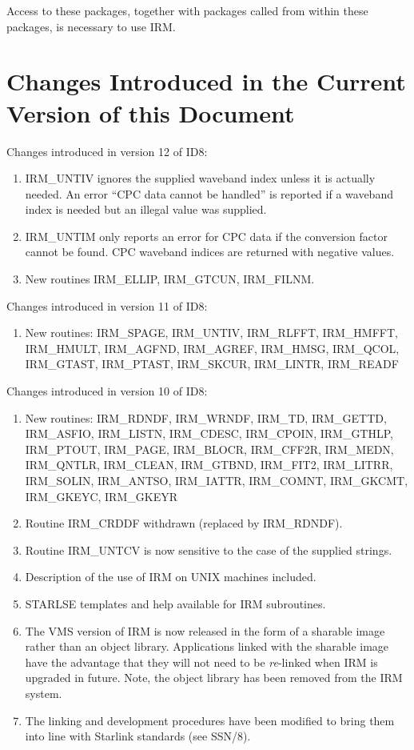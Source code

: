 Access to these packages, together with packages called from within these 
packages, is necessary to use IRM. 

\section {Changes Introduced in the Current Version of this Document}
\label {SEC:CHANGES}

Changes introduced in version 12 of ID8:
\begin{enumerate}
\item IRM\_UNTIV ignores the supplied waveband index unless it is actually
needed. An error ``CPC data cannot be handled'' is reported if a waveband index
is needed but an illegal value was supplied. 
\item IRM\_UNTIM only reports an error for CPC data if the conversion factor 
cannot be found. CPC waveband indices are returned with negative values.
\item New routines IRM\_ELLIP, IRM\_GTCUN, IRM\_FILNM.
\end{enumerate}

Changes introduced in version 11 of ID8:
\begin {enumerate}
\item New routines: IRM\_SPAGE, IRM\_UNTIV, IRM\_RLFFT, IRM\_HMFFT, 
IRM\_HMULT, IRM\_AGFND, IRM\_AGREF, IRM\_HMSG, IRM\_QCOL, IRM\_GTAST,
IRM\_PTAST, IRM\_SKCUR, IRM\_LINTR, IRM\_READF
\end {enumerate}

Changes introduced in version 10 of ID8:
\begin {enumerate}
\item New routines: IRM\_RDNDF, IRM\_WRNDF, IRM\_TD, IRM\_GETTD, IRM\_ASFIO, 
IRM\_LISTN, IRM\_CDESC, IRM\_CPOIN, IRM\_GTHLP, IRM\_PTOUT, IRM\_PAGE,
IRM\_BLOCR, IRM\_CFF2R, IRM\_MEDN, IRM\_QNTLR, IRM\_CLEAN, IRM\_GTBND,
IRM\_FIT2, IRM\_LITRR, IRM\_SOLIN, IRM\_ANTSO, IRM\_IATTR, IRM\_COMNT,
IRM\_GKCMT, IRM\_GKEYC, IRM\_GKEYR

\item Routine IRM\_CRDDF withdrawn (replaced by IRM\_RDNDF).
\item Routine IRM\_UNTCV is now sensitive to the case of the supplied strings.
\item Description of the use of IRM on UNIX machines included.
\item STARLSE templates and help available for IRM subroutines.
\item The VMS version of IRM is now released in the form of a sharable image 
rather than an object library. Applications linked with the sharable image have 
the advantage that they will not need to be {\em re}-linked when IRM is upgraded 
in future. Note, the object library has been removed from the IRM system.
\item The linking and development procedures have been modified to bring them 
into line with Starlink standards (see SSN/8).
\end {enumerate}


